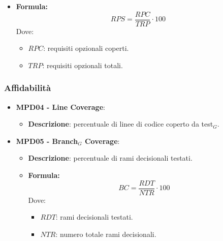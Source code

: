 \documentclass[10pt]{article}
\begin{document}
\begin{justify}
\begin{itemize}
\begin{itemize}
                \item   \textbf{Formula:}
                        \[
                        RPS = \frac{RPC}{TRP} \cdot 100
                        \]
                        Dove:
                        \begin{itemize}
                            \item $RPC$: requisiti opzionali coperti.
                            \item $TRP$: requisiti opzionali totali.
                        \end{itemize}
            \end{itemize}
\end{itemize}

\subsubsection{Affidabilità}
\begin{itemize}
    \item \textbf{MPD04 - Line Coverage}:
    \begin{itemize}
        \item \textbf{Descrizione}: percentuale di linee di codice coperto da test$_G$.
    \end{itemize}

    \item \textbf{MPD05 - Branch$_G$ Coverage}:
    \begin{itemize}
        \item   \textbf{Descrizione}: percentuale di rami decisionali testati.
        \item   \textbf{Formula:}
            \[
            BC = \frac{RDT}{NTR} \cdot 100
            \]
            Dove:
            \begin{itemize}
                \item $RDT$: rami decisionali testati.
                \item $NTR$: numero totale rami decisionali.
            \end{itemize}
    \end{itemize}


\end{itemize}
\end{justify}
\end{document}
